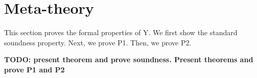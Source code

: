 \section{Meta-theory}
\label{sec:soundness}

This section proves the formal properties of Y. %
We first show the standard soundness property. 
Next, we prove P1. Then, we prove P2. %

{\bf TODO: present theorem and prove soundness. Present theorems and prove P1 and P2}


